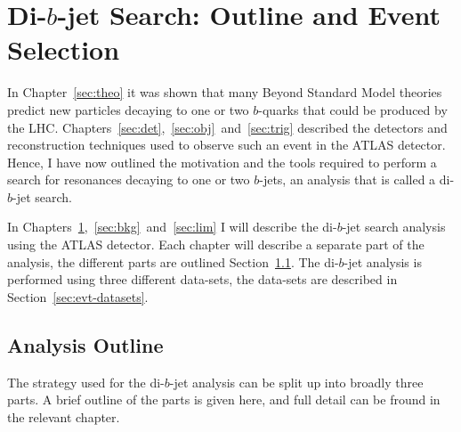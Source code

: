 \chapter{Di-$b$-jet Search: Outline and Event Selection}
\label{sec:evt}

In Chapter~\ref{sec:theo} it was shown that many Beyond Standard Model theories
predict new particles decaying to one or two $b$-quarks that could be produced by the LHC.
Chapters~\ref{sec:det},~\ref{sec:obj}~and~\ref{sec:trig}
described the detectors and reconstruction techniques used to observe such an event in the ATLAS detector.
Hence, I have now outlined the motivation and the tools required to perform
a search for resonances decaying to one or two $b$-jets,
an analysis that is called a di-$b$-jet search.

In Chapters~\ref{sec:evt},~\ref{sec:bkg}~and~\ref{sec:lim}
I will describe the di-$b$-jet search analysis using the ATLAS detector.
Each chapter will describe a separate part of the analysis,
the different parts are outlined Section~\ref{sec:evt-outline}.
The di-$b$-jet analysis is performed using three different data-sets,
the data-sets are described in Section~\ref{sec:evt-datasets}.

\section{Analysis Outline}
\label{sec:evt-outline}

The strategy used for the di-$b$-jet analysis
can be split up into broadly three parts.
A brief outline of the parts is given here,
and full detail can be fround in the relevant chapter.

